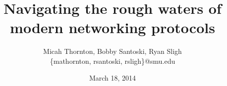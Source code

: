 \title{Navigating the rough waters of modern networking protocols}
\date{March 18, 2014}
\author{Micah Thornton, Bobby Santoski, Ryan Sligh \\ \small{\{mathornton, rsantoski, rsligh\}@smu.edu}}
\maketitle
